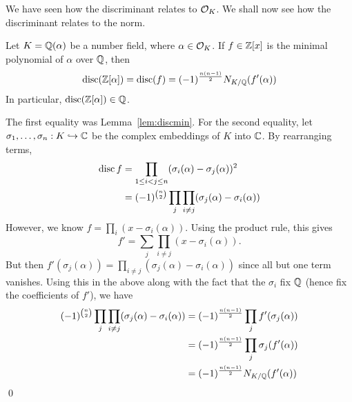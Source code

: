We have seen how the discriminant relates to $\mathcal{O}_K$. We shall now see how the discriminant relates to the norm.


\begin{lem}\label{lem:discnorm}
Let $K=\mathbb{Q}(\alpha)$ be a number field, where $\alpha \in \mathcal{O}_K$. If $f \in \mathbb{Z}[x]$ is the minimal polynomial of $\alpha$ over $\mathbb{Q}$, then	
	\[
	\operatorname{disc}(\mathbb{Z}[\alpha])= \operatorname{disc}(f)= (-1)^{\frac{n(n-1)}{2}} N_{K/\mathbb{Q}}(f'(\alpha))
	\]
In particular, $\operatorname{disc}(\mathbb{Z}[\alpha]) \in \mathbb{Q}$. 
\end{lem}

\pf The first equality was Lemma~\ref{lem:discmin}. For the second equality, let $\sigma_1,\ldots,\sigma_n: K \hookrightarrow \mathbb{C}$ be the complex embeddings of $K$ into $\mathbb{C}$. By rearranging terms,
	\[
	\begin{split}
	\operatorname{disc} f&= \prod_{1 \leq i < j \leq n} (\sigma_i(\alpha) - \sigma_j(\alpha))^2 \\
	&= (-1)^{\binom{n}{2}} \prod_j \prod_{i \neq j} (\sigma_j(\alpha) - \sigma_i(\alpha))
	\end{split}
	\]
However, we know $f=\prod_i (x - \sigma_i(\alpha))$. Using the product rule, this gives 
	\[
	f'= \sum_j \prod_{i \neq j} (x - \sigma_i(\alpha)).
	\]
But then $f'(\sigma_j(\alpha))= \prod_{i \neq j} (\sigma_j(\alpha) - \sigma_i(\alpha))$ since all but one term vanishes. Using this in the above along with the fact that the $\sigma_i$ fix $\mathbb{Q}$ (hence fix the coefficients of $f'$), we have
	\[
	\begin{split}
	(-1)^{\binom{n}{2}} \prod_j \prod_{i \neq j} (\sigma_j(\alpha) - \sigma_i(\alpha))&= (-1)^{\frac{n(n-1)}{2}} \prod_j f'(\sigma_j(\alpha)) \\
	&= (-1)^{\frac{n(n-1)}{2}} \prod_j \sigma_j(f'(\alpha)) \\
	&=  (-1)^{\frac{n(n-1)}{2}} N_{K/\mathbb{Q}}(f'(\alpha))
	\end{split}
	\] \qed \pskip


